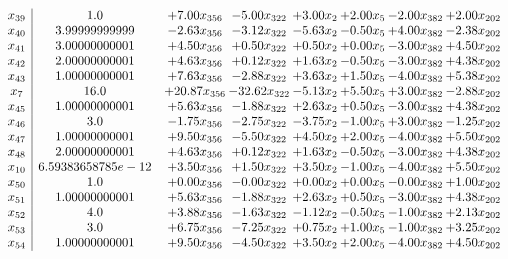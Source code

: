 \documentclass[8pt]{article}
\begin{document}
\[\begin{array}{c| c c@{\hskip 2pt} c@{\hskip 2pt} c@{\hskip 2pt} c@{\hskip 2pt} c@{\hskip 2pt} c@{\hskip 2pt} }
 x_{39}   &  1.0 & +  7.00 x_{356} & -5.00 x_{322} & +  3.00 x_{2} & +  2.00 x_{5} & -2.00 x_{382} & +  2.00 x_{202}\\
 x_{40}   &  3.99999999999 & -2.63 x_{356} & -3.12 x_{322} & -5.63 x_{2} & -0.50 x_{5} & +  4.00 x_{382} & -2.38 x_{202}\\
 x_{41}   &  3.00000000001 & +  4.50 x_{356} & +  0.50 x_{322} & +  0.50 x_{2} & +  0.00 x_{5} & -3.00 x_{382} & +  4.50 x_{202}\\
 x_{42}   &  2.00000000001 & +  4.63 x_{356} & +  0.12 x_{322} & +  1.63 x_{2} & -0.50 x_{5} & -3.00 x_{382} & +  4.38 x_{202}\\
 x_{43}   &  1.00000000001 & +  7.63 x_{356} & -2.88 x_{322} & +  3.63 x_{2} & +  1.50 x_{5} & -4.00 x_{382} & +  5.38 x_{202}\\
 x_{7}   &  16.0 & + 20.87 x_{356} & -32.62 x_{322} & -5.13 x_{2} & +  5.50 x_{5} & +  3.00 x_{382} & -2.88 x_{202}\\
 x_{45}   &  1.00000000001 & +  5.63 x_{356} & -1.88 x_{322} & +  2.63 x_{2} & +  0.50 x_{5} & -3.00 x_{382} & +  4.38 x_{202}\\
 x_{46}   &  3.0 & -1.75 x_{356} & -2.75 x_{322} & -3.75 x_{2} & -1.00 x_{5} & +  3.00 x_{382} & -1.25 x_{202}\\
 x_{47}   &  1.00000000001 & +  9.50 x_{356} & -5.50 x_{322} & +  4.50 x_{2} & +  2.00 x_{5} & -4.00 x_{382} & +  5.50 x_{202}\\
 x_{48}   &  2.00000000001 & +  4.63 x_{356} & +  0.12 x_{322} & +  1.63 x_{2} & -0.50 x_{5} & -3.00 x_{382} & +  4.38 x_{202}\\
 x_{10}   &  6.59383658785e-12 & +  3.50 x_{356} & +  1.50 x_{322} & +  3.50 x_{2} & -1.00 x_{5} & -4.00 x_{382} & +  5.50 x_{202}\\
 x_{50}   &  1.0 & +  0.00 x_{356} & -0.00 x_{322} & +  0.00 x_{2} & +  0.00 x_{5} & -0.00 x_{382} & +  1.00 x_{202}\\
 x_{51}   &  1.00000000001 & +  5.63 x_{356} & -1.88 x_{322} & +  2.63 x_{2} & +  0.50 x_{5} & -3.00 x_{382} & +  4.38 x_{202}\\
 x_{52}   &  4.0 & +  3.88 x_{356} & -1.63 x_{322} & -1.12 x_{2} & -0.50 x_{5} & -1.00 x_{382} & +  2.13 x_{202}\\
 x_{53}   &  3.0 & +  6.75 x_{356} & -7.25 x_{322} & +  0.75 x_{2} & +  1.00 x_{5} & -1.00 x_{382} & +  3.25 x_{202}\\
 x_{54}   &  1.00000000001 & +  9.50 x_{356} & -4.50 x_{322} & +  3.50 x_{2} & +  2.00 x_{5} & -4.00 x_{382} & +  4.50 x_{202}\\

\end{array}\]
\end{document}
